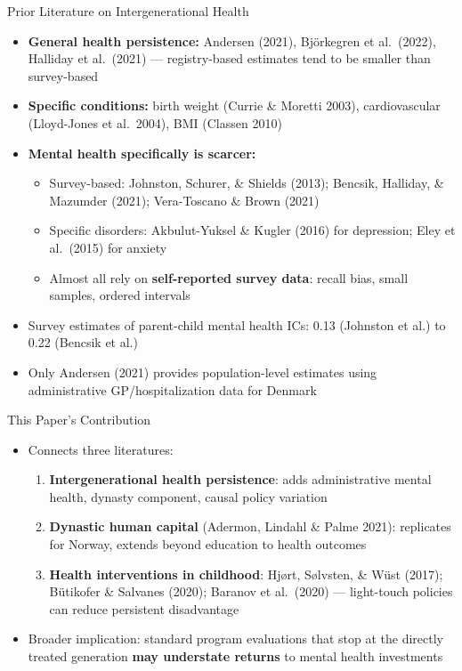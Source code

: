 \documentclass[aspectratio=169]{beamer}
\begin{document}
\begin{frame}{Prior Literature on Intergenerational Health}
  \begin{itemize}
    \item \textbf{General health persistence:} Andersen (2021), Bj\"{o}rkegren et al.\ (2022), Halliday et al.\ (2021) --- registry-based estimates tend to be smaller than survey-based
    \item \textbf{Specific conditions:} birth weight (Currie \& Moretti 2003), cardiovascular (Lloyd-Jones et al.\ 2004), BMI (Classen 2010)
    \item \textbf{Mental health specifically is scarcer:}
    \begin{itemize}
      \item Survey-based: Johnston, Schurer, \& Shields (2013); Bencsik, Halliday, \& Mazumder (2021); Vera-Toscano \& Brown (2021)
      \item Specific disorders: Akbulut-Yuksel \& Kugler (2016) for depression; Eley et al.\ (2015) for anxiety
      \item Almost all rely on \textbf{self-reported survey data}: recall bias, small samples, ordered intervals
    \end{itemize}
    \item Survey estimates of parent-child mental health ICs: 0.13 (Johnston et al.) to 0.22 (Bencsik et al.)
    \item Only Andersen (2021) provides population-level estimates using administrative GP/hospitalization data for Denmark
  \end{itemize}
\end{frame}

\begin{frame}{This Paper's Contribution}
  \begin{itemize}
    \item Connects three literatures:
    \begin{enumerate}
      \item \textbf{Intergenerational health persistence}: adds administrative mental health, dynasty component, causal policy variation
      \item \textbf{Dynastic human capital} (Adermon, Lindahl \& Palme 2021): replicates for Norway, extends beyond education to health outcomes
      \item \textbf{Health interventions in childhood}: Hj\o{}rt, S\o{}lvsten, \& W\"{u}st (2017); B\"{u}tikofer \& Salvanes (2020); Baranov et al.\ (2020) --- light-touch policies can reduce persistent disadvantage
    \end{enumerate}
    \item Broader implication: standard program evaluations that stop at the directly treated generation \textbf{may understate returns} to mental health investments
  \end{itemize}
\end{frame}
\end{document}
